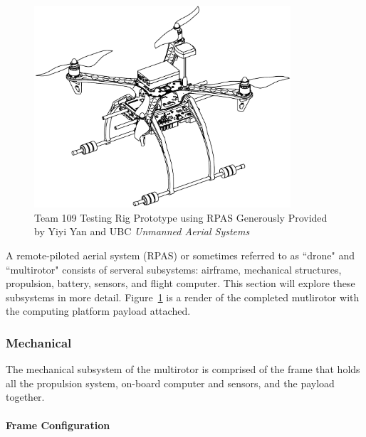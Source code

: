 \begin{figure}[H]
	\centering
	\includegraphics[width=0.85\textwidth]{img/testrigcad1.png}
	\caption[Team 109 Testing Rig Prototype]{Team 109 Testing Rig Prototype using RPAS Generously Provided by Yiyi Yan and UBC \textit{Unmanned Aerial Systems}}
	\label{fig:testrigcad1}
\end{figure}

A remote-piloted aerial system (RPAS) or sometimes referred to as ``drone" and ``multirotor" consists of serveral subsystems: airframe, mechanical structures, propulsion, battery, sensors, and flight computer. This section will explore these subsystems in more detail. Figure~\ref{fig:testrigcad1} is a render of the completed mutlirotor with the computing platform payload attached.

\subsubsection{Mechanical}\label{section:drone-mech}
The mechanical subsystem of the multirotor is comprised of the frame that holds all the propulsion system, on-board computer and sensors, and the payload together.

\paragraph{Frame Configuration}

